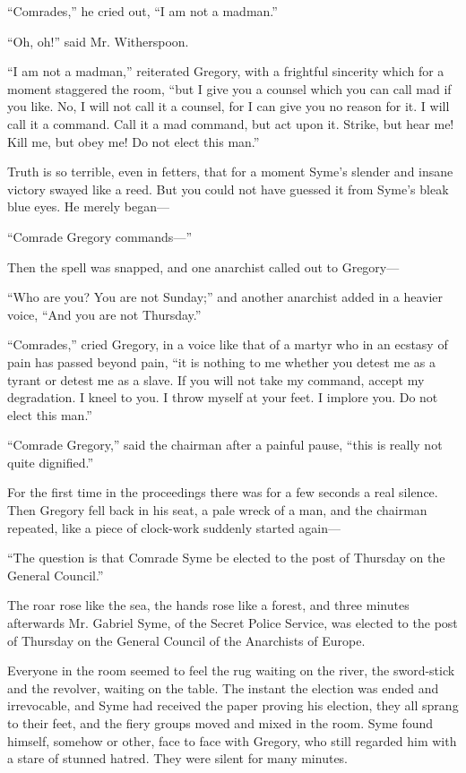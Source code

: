 \documentclass{book}
\begin{document}
“Comrades,” he cried out, “I am not a madman.”

“Oh, oh!” said Mr. Witherspoon.

“I am not a madman,” reiterated Gregory, with a frightful sincerity which for a moment staggered the room, “but I give you a counsel which you can call mad if you like. No, I will not call it a counsel, for I can give you no reason for it. I will call it a command. Call it a mad command, but act upon it. Strike, but hear me! Kill me, but obey me! Do not elect this man.”

Truth is so terrible, even in fetters, that for a moment Syme’s slender and insane victory swayed like a reed. But you could not have guessed it from Syme’s bleak blue eyes. He merely began—

“Comrade Gregory commands—”

Then the spell was snapped, and one anarchist called out to Gregory—

“Who are you? You are not Sunday;” and another anarchist added in a heavier voice, “And you are not Thursday.”

“Comrades,” cried Gregory, in a voice like that of a martyr who in an ecstasy of pain has passed beyond pain, “it is nothing to me whether you detest me as a tyrant or detest me as a slave. If you will not take my command, accept my degradation. I kneel to you. I throw myself at your feet. I implore you. Do not elect this man.”

“Comrade Gregory,” said the chairman after a painful pause, “this is really not quite dignified.”

For the first time in the proceedings there was for a few seconds a real silence. Then Gregory fell back in his seat, a pale wreck of a man, and the chairman repeated, like a piece of clock-work suddenly started again—

“The question is that Comrade Syme be elected to the post of Thursday on the General Council.”

The roar rose like the sea, the hands rose like a forest, and three minutes afterwards Mr. Gabriel Syme, of the Secret Police Service, was elected to the post of Thursday on the General Council of the Anarchists of Europe.

Everyone in the room seemed to feel the rug waiting on the river, the sword-stick and the revolver, waiting on the table. The instant the election was ended and irrevocable, and Syme had received the paper proving his election, they all sprang to their feet, and the fiery groups moved and mixed in the room. Syme found himself, somehow or other, face to face with Gregory, who still regarded him with a stare of stunned hatred. They were silent for many minutes.
\end{document}

